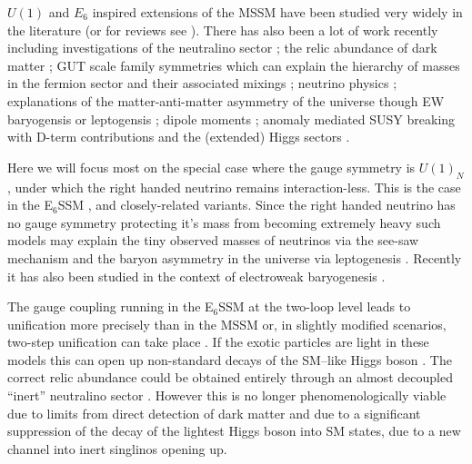 \documentclass[preprint,amsmath,amssymb,aps,superscriptaddress,prd,showpacs,floatfix,nofootinbib]{revtex4-1}
\begin{document}
$U(1)$ and $E_6$ inspired extensions of the MSSM have been studied
very widely in the literature \cite{Gunion:1989we, Gunion:1992hs,
  Binetruy:1985xm, Ellis:1986yg, Ibanez:1986si, Gunion:1986ky,
  Haber:1986gz, Baer:1987eb, Gunion:1987jd, Grifols:1986vr,
  Ellis:1986ip, Morris:1987fm, Drees:1987tp, Ma:1995xk,
  Suematsu:1997tv, Suematsu:1997qt, Suematsu:1997au, Keith:1996fv,
  Keith:1997zb, Gherghetta:1996yr, Demir:1998dk, Langacker:1998tc,
  Hambye:2000bn, Ma:2000jf} (or for reviews see
\cite{Hewett:1988xc,Langacker:2008yv}).  There has also been a lot of
work recently including investigations of the neutralino sector
\cite{Hesselbach:2001ri, Barger:2005hb, Choi:2006fz,
  Barger:2007nv}; the relic abundance of dark matter
\cite{Kalinowski:2008iq}; GUT scale family symmetries which can
explain the hierarchy of masses in the fermion sector and their
associated mixings \cite{Stech:2008wd}; neutrino physics
\cite{Kang:2004ix}; explanations of the matter-anti-matter asymmetry
of the universe though EW baryogensis or leptogensis
\cite{Hambye:2000bn,Ma:2000jf,Kang:2004pp}; dipole moments
\cite{GutierrezRodriguez:2006hb}; anomaly mediated SUSY breaking with
D-term contributions \cite{Asano:2008ju} and the (extended) Higgs
sectors \cite{Daikoku:2000ep,Ham:2008xf}.



Here we will focus most on the special case where the gauge symmetry
is $U(1)_N$, under which the right handed neutrino remains
interaction-less. This is the case in the E$_6$SSM
\cite{King:2005jy,King:2005my,Athron:2010zz}, and closely-related
variants\cite{Howl:2007zi, Braam:2009fi, Braam:2010sy, Hall:2011zq,
  Nevzorov:2012hs, Athron:2014pua}.  Since the right handed neutrino
has no gauge symmetry protecting it's mass from becoming extremely
heavy such models may explain the tiny observed masses of neutrinos
via the see-saw mechanism and the baryon asymmetry in the universe via
leptogenesis \cite{Hambye:2000bn,King:2008qb, King:2008gw}.  Recently
it has also been studied in the context of electroweak baryogenesis
\cite{Chao:2014hya}.

The gauge coupling running in the E$_6$SSM at the two-loop level leads
to unification more precisely than in the MSSM \cite{King:2007uj} or,
in slightly modified scenarios, two-step unification can take place
\cite{Howl:2007hq,Howl:2007zi}. If the exotic particles are light in
these models this can open up non-standard decays of the SM--like
Higgs boson \cite{Hall:2010ix,Nevzorov:2013tta,Athron:2014pua}. The
correct relic abundance could be obtained entirely through an almost
decoupled ``inert'' neutralino sector \cite{Hall:2009aj}.  However
this is no longer phenomenologically viable due to limits from direct
detection of dark matter
\cite{2011PhRvL.107m1302A,2012PhRvL.109r1301A, Akerib:2013tjd} and due
to a significant suppression of the decay of the lightest Higgs boson
into SM states, due to a new channel into inert singlinos opening up.
\end{document}
